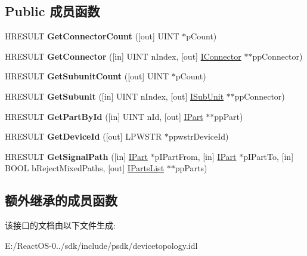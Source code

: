 \subsection*{Public 成员函数}
\begin{DoxyCompactItemize}
\item 
\mbox{\label{interface_i_device_topology_a7310187d9a2ddc29b4196bd1b24d7593}} 
H\+R\+E\+S\+U\+LT {\bfseries Get\+Connector\+Count} (\mbox{[}out\mbox{]} U\+I\+NT $\ast$p\+Count)
\item 
\mbox{\label{interface_i_device_topology_ad53e5522b1c90003320a1a24a4999cd0}} 
H\+R\+E\+S\+U\+LT {\bfseries Get\+Connector} (\mbox{[}in\mbox{]} U\+I\+NT n\+Index, \mbox{[}out\mbox{]} \hyperlink{interface_i_connector}{I\+Connector} $\ast$$\ast$pp\+Connector)
\item 
\mbox{\label{interface_i_device_topology_adbcfc4cee3e207e3e61aaa9fa03cc1ce}} 
H\+R\+E\+S\+U\+LT {\bfseries Get\+Subunit\+Count} (\mbox{[}out\mbox{]} U\+I\+NT $\ast$p\+Count)
\item 
\mbox{\label{interface_i_device_topology_a2a9162c9f0c4733e3f4915400055ff05}} 
H\+R\+E\+S\+U\+LT {\bfseries Get\+Subunit} (\mbox{[}in\mbox{]} U\+I\+NT n\+Index, \mbox{[}out\mbox{]} \hyperlink{interface_i_sub_unit}{I\+Sub\+Unit} $\ast$$\ast$pp\+Connector)
\item 
\mbox{\label{interface_i_device_topology_ae52e2ec61fed1dd45b670e987543f978}} 
H\+R\+E\+S\+U\+LT {\bfseries Get\+Part\+By\+Id} (\mbox{[}in\mbox{]} U\+I\+NT n\+Id, \mbox{[}out\mbox{]} \hyperlink{interface_i_part}{I\+Part} $\ast$$\ast$pp\+Part)
\item 
\mbox{\label{interface_i_device_topology_a7dc81731db0946d2d5dca8c325be12d1}} 
H\+R\+E\+S\+U\+LT {\bfseries Get\+Device\+Id} (\mbox{[}out\mbox{]} L\+P\+W\+S\+TR $\ast$ppwstr\+Device\+Id)
\item 
\mbox{\label{interface_i_device_topology_ab8382575847b4b472a288ead6f9631d9}} 
H\+R\+E\+S\+U\+LT {\bfseries Get\+Signal\+Path} (\mbox{[}in\mbox{]} \hyperlink{interface_i_part}{I\+Part} $\ast$p\+I\+Part\+From, \mbox{[}in\mbox{]} \hyperlink{interface_i_part}{I\+Part} $\ast$p\+I\+Part\+To, \mbox{[}in\mbox{]} B\+O\+OL b\+Reject\+Mixed\+Paths, \mbox{[}out\mbox{]} \hyperlink{interface_i_parts_list}{I\+Parts\+List} $\ast$$\ast$pp\+Parts)
\end{DoxyCompactItemize}
\subsection*{额外继承的成员函数}


该接口的文档由以下文件生成\+:\begin{DoxyCompactItemize}
\item 
E\+:/\+React\+O\+S-\/0../sdk/include/psdk/devicetopology.\+idl\end{DoxyCompactItemize}
